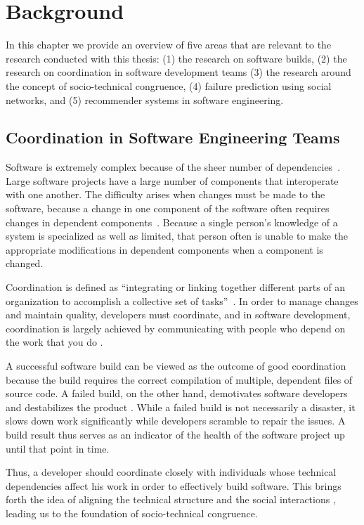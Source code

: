 \section{Background}
\label{chap:bg}
In this chapter we provide an overview of five areas that are relevant to the research conducted with this thesis: (1) the research on software builds, (2) the research on coordination in software development teams (3) the research around the concept of socio-technical congruence, (4) failure prediction using social networks, and (5) recommender systems in software engineering.

\subsection{Coordination in Software Engineering Teams}
Software is extremely complex because of the sheer number of dependencies~\cite{sawyer2004:teams}.
Large software projects have a large number of components that interoperate with one another.
The difficulty arises when changes must be made to the software, because a change in one component of the software often requires changes in dependent components~\cite{desouza:2008}. Because a single person's knowledge of a system is specialized as well as limited, that person often is unable to make the appropriate modifications in dependent components when a component is changed.

Coordination is defined as ``integrating or linking together different parts of an organization to accomplish a collective set of tasks''~\cite{vandeven1976}. In order to manage changes and maintain quality, developers must coordinate, and in software development, coordination is largely achieved by communicating with people who depend on the work that you do \cite{kraut:1995coordination}.

A successful software build can be viewed as the outcome of good coordination because the build requires the correct compilation of multiple, dependent files of source code.
A failed build, on the other hand, demotivates software developers \cite{holck2004,damian:icgse:2007} and destabilizes the product \cite{cusumano1997}.
While a failed build is not necessarily a disaster, it slows down work significantly while developers scramble to repair the issues.
A build result thus serves as an indicator of the health of the software project up until that point in time.

Thus, a developer should coordinate closely with individuals whose technical dependencies affect his work in order to effectively build software. This brings forth the idea of aligning the technical structure and the social interactions \cite{herbsleb2007:fose}, leading us to the foundation of socio-technical congruence.

